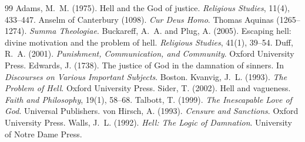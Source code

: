 \documentclass{situationist-preprint}
\begin{document}
\begin{thebibliography}{99}\small
{} Adams, M.~M. (1975). Hell and the God of justice. \emph{Religious Studies}, 11(4), 433--447.
 Anselm of Canterbury (1098). \emph{Cur Deus Homo}.
 Thomas Aquinas (1265--1274). \emph{Summa Theologiae}.
 Buckareff, A.~A. and Plug, A. (2005). Escaping hell: divine motivation and the problem of hell. \emph{Religious Studies}, 41(1), 39--54.
 Duff, R.~A. (2001). \emph{Punishment, Communication, and Community}. Oxford University Press.
 Edwards, J. (1738). The justice of God in the damnation of sinners. In \emph{Discourses on Various Important Subjects}. Boston.
 Kvanvig, J.~L. (1993). \emph{The Problem of Hell}. Oxford University Press.
 Sider, T. (2002). Hell and vagueness. \emph{Faith and Philosophy}, 19(1), 58--68.
 Talbott, T. (1999). \emph{The Inescapable Love of God}. Universal Publishers.
 von Hirsch, A. (1993). \emph{Censure and Sanctions}. Oxford University Press.
 Walls, J.~L. (1992). \emph{Hell: The Logic of Damnation}. University of Notre Dame Press.
\end{thebibliography}
\end{document}
